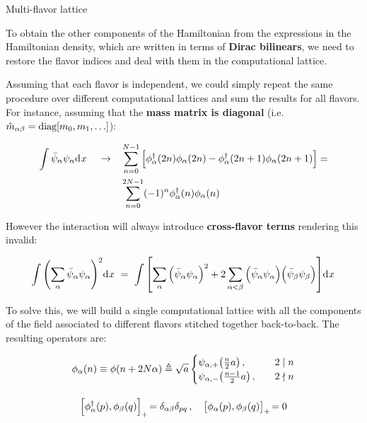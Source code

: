 
\begin{frame}[allowframebreaks]{Multi-flavor lattice}

  To obtain the other components of the Hamiltonian from the expressions in the Hamiltonian density, which are written in terms of \textbf{Dirac bilinears}, we need to restore the flavor indices and deal with them in the computational lattice.

  \vspace{1em}
  Assuming that each flavor is independent, we could simply repeat the same procedure over different computational lattices and sum the results for all flavors. For instance, assuming that the \textbf{mass matrix is diagonal} (i.e. $\hat{m}_{\alpha\beta}=\text{diag}\qty[m_0,m_1,\ldots]$):

  \begin{align*}
  \int \bar{\psi}_{\alpha}\psi_{\alpha} \text{d}^{}x\, \quad \rightarrow \quad
    &\sum_{n=0}^{N-1}
      \qty[ \phi_{\alpha}^{\dagger}(2n)\phi_{\alpha}(2n) -
      \phi_{\alpha}^{\dagger}(2n+1)\phi_{\alpha}(2n+1) ] = \\
    &\sum_{n=0}^{2N-1} (-1)^{n}\phi_{\alpha}^{\dagger}(n)\phi_{\alpha}(n)
  \end{align*}

\break

  However the interaction will always introduce \textbf{cross-flavor terms} rendering this invalid:

  \begin{gather*}
  \int \qty(\sum_{\alpha}\bar{\psi}_{\alpha}\psi_{\alpha})^{2} \text{d}^{}x\,
    \,=\,\,
    \int \qty[\sum_{\alpha} \qty(\bar{\psi}_{\alpha}\psi_{\alpha})^{2} +
    2\sum_{\alpha < \beta} \qty(\bar{\psi}_{\alpha}\psi_{\alpha})
    \qty(\bar{\psi}_{\beta}\psi_{\beta})] \text{d}^{}x\,
  \end{gather*}

  To solve this, we will build a single computational lattice with all the components of the field associated to different flavors stitched together back-to-back. The resulting operators are:

  \begin{gather*}
  \phi_{\alpha}(n) \equiv \phi(n + 2N\alpha) \defeq \sqrt{a}
    \begin{cases}
      \psi_{\alpha,+}\qty(\frac{n}{2}a) \qc &2 \mid n \\
      \psi_{\alpha,-}\qty(\frac{n-1}{2}a) \qc &2 \nmid n
    \end{cases} \\[1em]
    \acom{\phi_{\alpha}^{\dagger}(p)}{\phi_{\beta}(q)} =
      \delta_{\alpha\beta}\delta_{pq} \qc
    \acom{\phi_{\alpha}(p)}{\phi_{\beta}(q)} = 0
  \end{gather*}


\end{frame}
